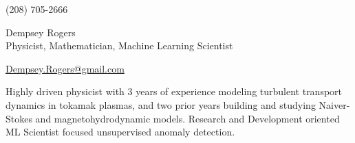 \documentclass[letterpaper,11pt]{article}
\begin{document}
\begin{center}
    \begin{minipage}[b]{0.24\textwidth}
            \large (208) 705-2666 
    \end{minipage}%
    \begin{minipage}[b]{0.45\textwidth}
            \centering
            {\Huge Dempsey Rogers} \\ %
            \vspace{0.1cm}
            {\color{cvblue} \Large{Physicist, Mathematician, Machine Learning Scientist}} \\
    \end{minipage}%
    \begin{minipage}[t]{0.24\textwidth}
            {\href{mailto:Dempsey.Rogers@gmail.com}{Dempsey.Rogers@gmail.com} } 
    \end{minipage}   
    
\vspace{-0.15cm} 
{\color{cvblue} \hrulefill}
\end{center}
\vspace{-0.2cm}
Highly driven physicist with 3 years of experience modeling turbulent transport dynamics in tokamak plasmas, and two prior years building and studying Naiver-Stokes and magnetohydrodynamic models. Research and Development oriented ML Scientist focused unsupervised anomaly detection. %

\vspace{-0.2cm}


\section{\color{cvblue}{Education} }
\end{document}
